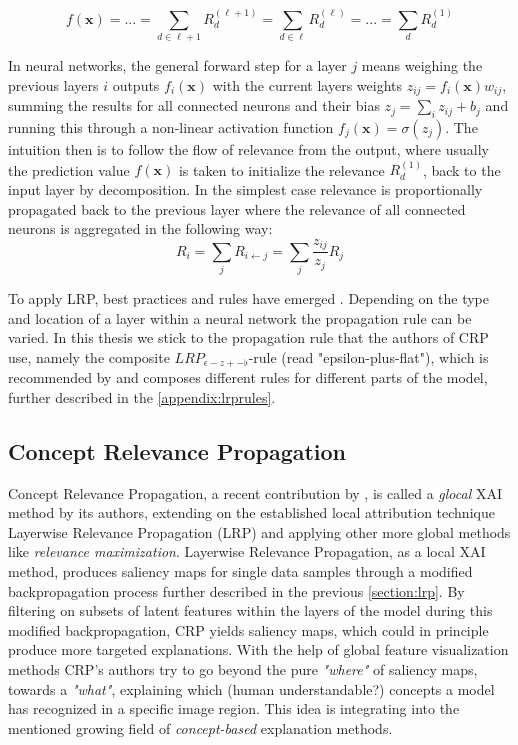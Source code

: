 \begin{equation}
    f(\mathbf{x}) = ... = \sum_{d \in \ell+1} R^{(\ell+1)}_d =  \sum_{d \in \ell} R^{(\ell)}_d = ... =  \sum_{d} R^{(1)}_d
\end{equation}

In neural networks, the general forward step for a layer $j$ means weighing the previous layers $i$ outputs $f_i(\mathbf{x})$ with the current layers weights $z_{ij} = f_i(\mathbf{x}) w_{ij}$, summing the results for all connected neurons and their bias $z_{j} = \sum_{i} z_{ij} + b_j$ and running this through a non-linear activation function $f_j(\mathbf{x}) = \sigma (z_j)$.
The intuition then is to follow the flow of relevance from the output, where usually the prediction value $f(\mathbf{x})$ is taken to initialize the relevance $R^(1)_d$, back to the input layer by decomposition. In the simplest case relevance is proportionally propagated back to the previous layer where the relevance of all connected neurons is aggregated in the following way:
\begin{equation}
    R_i = \sum_{j}  R_{i \leftarrow j} = \sum_{j} \frac{z_{ij}}{z_j} R_j
\end{equation}

To apply LRP, best practices and rules have emerged \cite{Kohlbrenner2020, Montavon2019, Samek2021}. Depending on the type and location of a layer within a neural network the propagation rule can be varied. In this thesis we stick to the propagation rule that the authors of CRP use, namely the composite $LRP_{\epsilon-z+-\flat}$-rule (read "epsilon-plus-flat"), which is recommended by \cite{Kohlbrenner2020} and composes different rules for different parts of the model, further described in the \cref{appendix:lrprules}.

\subsection{Concept Relevance Propagation}\label{section:crp_background}

Concept Relevance Propagation, a recent contribution by \cite{Achtibat2022}, is called a \textit{glocal} XAI method by its authors, extending on the established local attribution technique Layerwise Relevance Propagation (LRP) \cite{Bach2015} and applying other more global methods like \textit{relevance maximization}. 
Layerwise Relevance Propagation, as a local XAI method, produces saliency maps for single data samples through a modified backpropagation process further described in the previous \cref{section:lrp}. By filtering on subsets of latent features within the layers of the model during this modified backpropagation, CRP yields saliency maps, which could in principle produce more targeted explanations. With the help of global feature visualization methods CRP's authors try to go beyond the pure \textit{"where"} of saliency maps, towards a \textit{"what"}, explaining which (human understandable?) concepts a model has recognized in a specific image region. This idea is integrating into the mentioned growing field of \textit{concept-based} explanation methods.


